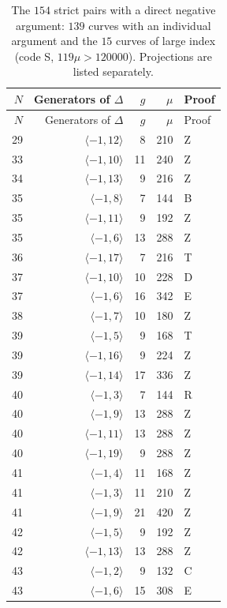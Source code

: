 \begin{longtable}{rrrrl}
\caption{The $154$ strict pairs with a direct negative argument: $139$ curves with an individual argument and the $15$ curves of large index (code S, $119\mu>120000$). Projections are listed separately.}\label{tab:negative}\\
\toprule $N$ & Generators of $\Delta$ & $g$ & $\mu$ & Proof \\
\midrule\endfirsthead
\toprule $N$ & Generators of $\Delta$ & $g$ & $\mu$ & Proof \\
\midrule\endhead
29 & $\langle -1, 12\rangle$ & 8 & 210 & Z \\
33 & $\langle -1, 10\rangle$ & 11 & 240 & Z \\
34 & $\langle -1, 13\rangle$ & 9 & 216 & Z \\
35 & $\langle -1, 8\rangle$ & 7 & 144 & B \\
35 & $\langle -1, 11\rangle$ & 9 & 192 & Z \\
35 & $\langle -1, 6\rangle$ & 13 & 288 & Z \\
36 & $\langle -1, 17\rangle$ & 7 & 216 & T \\
37 & $\langle -1, 10\rangle$ & 10 & 228 & D \\
37 & $\langle -1, 6\rangle$ & 16 & 342 & E \\
38 & $\langle -1, 7\rangle$ & 10 & 180 & Z \\
39 & $\langle -1, 5\rangle$ & 9 & 168 & T \\
39 & $\langle -1, 16\rangle$ & 9 & 224 & Z \\
39 & $\langle -1, 14\rangle$ & 17 & 336 & Z \\
40 & $\langle -1, 3\rangle$ & 7 & 144 & R \\
40 & $\langle -1, 9\rangle$ & 13 & 288 & Z \\
40 & $\langle -1, 11\rangle$ & 13 & 288 & Z \\
40 & $\langle -1, 19\rangle$ & 9 & 288 & Z \\
41 & $\langle -1, 4\rangle$ & 11 & 168 & Z \\
41 & $\langle -1, 3\rangle$ & 11 & 210 & Z \\
41 & $\langle -1, 9\rangle$ & 21 & 420 & Z \\
42 & $\langle -1, 5\rangle$ & 9 & 192 & Z \\
42 & $\langle -1, 13\rangle$ & 13 & 288 & Z \\
43 & $\langle -1, 2\rangle$ & 9 & 132 & C \\
43 & $\langle -1, 6\rangle$ & 15 & 308 & E \\

\end{longtable}
